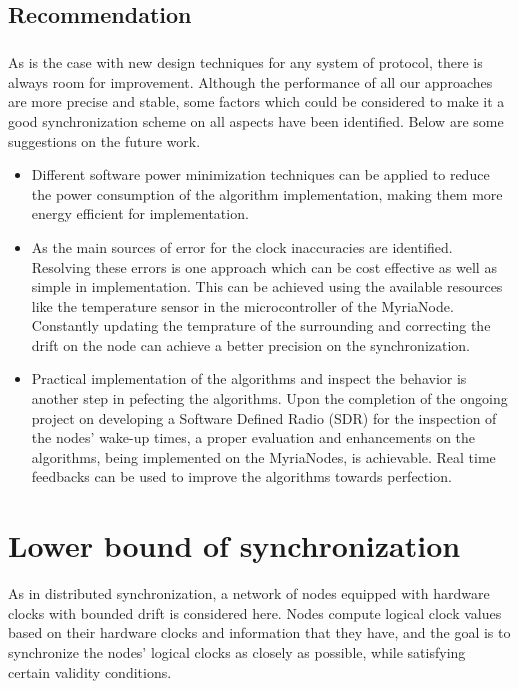 \documentclass[a4paper,10pt]{report}
\begin{document}
\section{\textbf{Recommendation}}
\paragraph*{}
As is the case with new design techniques for any system of protocol, there is always room for improvement. Although the performance of all our approaches are more precise and stable,  some factors which could be considered to make it a good synchronization scheme on all aspects have been identified. Below are some suggestions on the future work.
\begin{itemize}
\item
Different software power minimization techniques can be applied to reduce the power consumption of the algorithm implementation, making them more energy efficient for implementation.
\item  As the main sources of error for the clock inaccuracies are identified. Resolving these errors is one approach which can be cost effective as well as simple in implementation. This can be achieved using the available resources like the temperature sensor in the microcontroller of the MyriaNode. Constantly updating the temprature of the surrounding and correcting the drift on the node can achieve a better precision on the synchronization.
\item
Practical implementation of the algorithms and inspect the behavior is another step in pefecting the algorithms. Upon the completion of the ongoing project on developing a Software Defined Radio (SDR) for the inspection of the nodes' wake-up times, a proper evaluation and enhancements on the algorithms, being implemented on the MyriaNodes, is achievable. Real time feedbacks can be used to improve the algorithms towards perfection.
\end{itemize}
\appendix
\chapter{\textbf{Lower bound of synchronization}}
As in distributed synchronization, a network of nodes equipped with hardware clocks with bounded drift is considered
here. Nodes compute logical clock values based on their hardware clocks and information that they have, and the goal is to
synchronize the nodes' logical clocks as closely as possible, while satisfying certain validity conditions.
\end{document}
